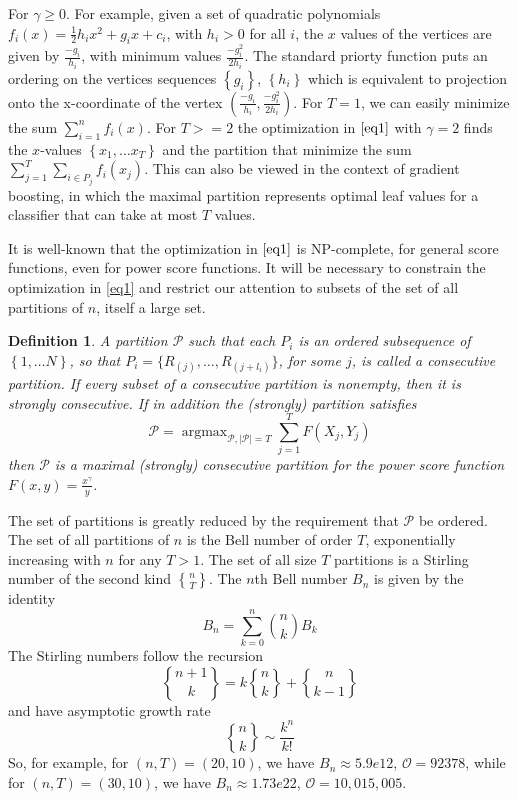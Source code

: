 \documentclass{article}
\newtheorem{definition}{Definition}
\theoremstyle{case}
\DeclareMathOperator*{\argmax}{argmax} %
\newcommand{\stirlingii}{\genfrac{\{}{\}}{0pt}{}}
\begin{document}
For $\gamma \geq 0$. For example, given a set of quadratic polynomials $f_i(x) = \frac{1}{2}h_ix^2 + g_ix + c_i$, with $h_i >0$ for all $i$, the $x$ values of the vertices are given by $\frac{-g_i}{h_i}$, with minimum values $\frac{-g_i^2}{2h_i}$. The standard priorty function puts an ordering on the vertices sequences $\left\lbrace g_i\right\rbrace$, $\left\lbrace h_i  \right\rbrace$ which is equivalent to projection onto the x-coordinate of the vertex $\left(\frac{-g_i}{h_i},\frac{-g_i^2}{2h_i}\right)$. For $T = 1$, we can easily minimize the sum $\sum_{i=1}^{n} f_i(x)$. For $T >= 2$ the optimization in $\ref{eq1}$ with $\gamma = 2$ finds the $x$-values $\left\lbrace x_1, \dots x_T\right\rbrace$ and the partition that minimize the sum $\sum_{j=1}^T \sum_{i \in P_j} f_i\left( x_j\right)$. This can also be viewed in the context of gradient boosting, in which the maximal partition represents optimal leaf values for a classifier that can take at most $T$ values.

It is well-known that the optimization in $\ref{eq1}$ is NP-complete, for general score functions, even for power score functions. It will be necessary to constrain the optimization in \ref{eq1} and restrict our attention to subsets of the set of all partitions of $n$, itself a large set.

\begin{definition}
A partition $\mathcal{P}$ such that each $P_i$ is an ordered subsequence of $\left\lbrace 1, \dots N\right\rbrace$, so that $P_i = \{R_{(j)}, \dots, R_{(j+l_i)}\}$, for some $j$, is called a consecutive partition. If every subset of a consecutive partition is nonempty, then it is strongly consecutive. 
If in addition the (strongly) partition satisfies
\[
\mathcal{P} = \argmax_{\mathcal{P}, \vert \mathcal{P} \vert = T}\sum_{j=1}^{T}F\left( X_j, Y_j \right)
\]
then $\mathcal{P}$ is a maximal (strongly) consecutive partition for the power score function $F(x,y) = \frac{x^\gamma}{y}$.
\end{definition}

The set of partitions is greatly reduced by the requirement that $\mathcal{P}$ be ordered. The set of all partitions of $n$ is the Bell number of order $T$, exponentially increasing with $n$ for any $T > 1$. The set of all size $T$ partitions is a Stirling number of the second kind $\stirlingii{n}{T}$. The $n$th Bell number $B_n$ is given by the identity
\[B_n = \sum_{k=0}^{n} \binom{n}{k} B_k\]
The Stirling numbers follow the recursion
\[\stirlingii{n+1}{k} = k\stirlingii{n}{k} + \stirlingii{n}{k-1}\]
and have asymptotic growth rate 
\[\stirlingii{n}{k} \sim \frac{k^n}{k!}\]
So, for example, for $\left(n,T\right) = \left(20, 10\right)$, we have $B_n \approx 5.9e12$, $\mathcal{O} = 92378$, while for $\left(n,T\right) = \left(30, 10\right)$, we have $B_n \approx 1.73e22$, $\mathcal{O} = 10,015,005$.
\end{document}
